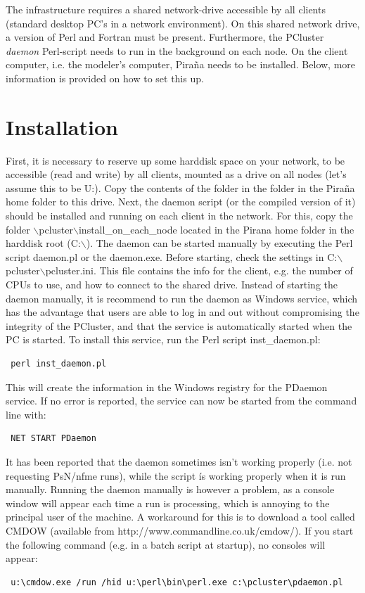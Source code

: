 \documentclass[a4,11pt]{report} \usepackage[pdftex]{graphicx}
\begin{document}
The infrastructure requires a shared network-drive accessible by all
clients (standard desktop PC's in a network environment). On this
shared network drive, a version of Perl and Fortran must be
present. Furthermore, the PCluster \textit{daemon} Perl-script
needs to run in the background on each node. On
the client computer, i.e. the modeler's computer, Pira\~na needs to be
installed. Below, more information is provided on how to set this up.

\section{Installation} First, it is necessary to reserve up some
harddisk space on your network, to be accessible (read and write) by
all clients, mounted as a drive on all nodes (let's assume this to be
U:). Copy the contents of the folder
 \normalfont in the
 \normalfont folder in the Pira\~na home folder to
this drive. Next, the daemon script (or the compiled version of it) should be
installed and running on each client in the network. For this, copy
the folder $\backslash$pcluster$\backslash$install\_on\_each\_node located in the Pirana home folder in the
harddisk root (C:$\backslash$). The daemon can be started manually by
executing the Perl script daemon.pl or the daemon.exe.  Before
starting, check the settings in
C:$\backslash$pcluster$\backslash$pcluster.ini. This file contains the
info for the client, e.g. the number of CPUs to use, and how to
connect to the shared drive.  Instead of starting the daemon manually, it is recommend to run the daemon as Windows service, which has the advantage that users are able to log in and out without compromising the integrity of the PCluster, and that
the service is automatically started when the PC is started. To
install this service, run the Perl script inst\_daemon.pl:
\begin{verbatim} perl inst_daemon.pl
\end{verbatim} This will create the information in the Windows
registry for the PDaemon service. If no error is reported, the service
can now be started from the command line with:
\begin{verbatim} NET START PDaemon
\end{verbatim}

It has been reported that the daemon sometimes isn't working properly
(i.e. not requesting PsN/nfme runs), while the script \'is working
properly when it is run manually. Running the daemon manually is
however a problem, as a console window will appear each time a run is
processing, which is annoying to the principal user of the machine. A
workaround for this is to download a tool called CMDOW (available from
http://www.commandline.co.uk/cmdow/). If you start the following
command (e.g. in a batch script at startup), no consoles will appear:
\begin{verbatim} u:\cmdow.exe /run /hid u:\perl\bin\perl.exe c:\pcluster\pdaemon.pl
\end{verbatim}
\end{document}
